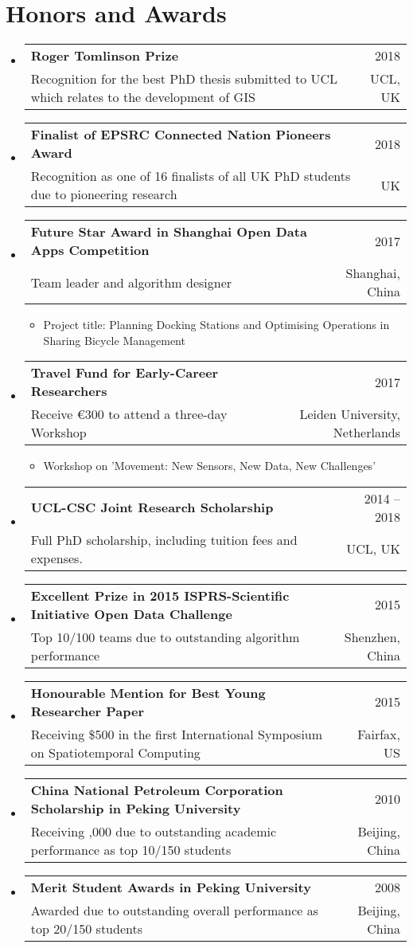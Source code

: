 \documentclass[A4,11pt]{article}
\makeatletter
\newcommand{\CVItem}[1]{
  \item\small{
    {#1 \vspace{-2pt}}
  }
}
\newcommand{\CVSubheading}[4]{
  \vspace{-2pt}\item
    \begin{tabular*}{0.97\textwidth}[t]{l@{\extracolsep{\fill}}r}
      \textbf{#1} & #2 \\
      \small#3 & \small #4 \\
    \end{tabular*}\vspace{-7pt}
}
\newcommand{\CVSubHeadingListStart}{\begin{itemize}[leftmargin=0.5cm, label={}]}
\newcommand{\CVSubHeadingListEnd}{\end{itemize}}
\newcommand{\CVItemListStart}{\begin{itemize}}
\newcommand{\CVItemListEnd}{\end{itemize}\vspace{-5pt}}
\makeatother
\begin{document}
\section{Honors and Awards}
  \CVSubHeadingListStart
    \CVSubheading
      {Roger Tomlinson Prize}{2018}
      {Recognition for the best PhD thesis submitted to UCL which relates to the development of GIS}{UCL, UK}
    \CVSubheading
      {Finalist of EPSRC Connected Nation Pioneers Award}{2018}
      {Recognition as one of 16 finalists of all UK PhD students due to pioneering research}{UK}
    \CVSubheading
      {Future Star Award in Shanghai Open Data Apps Competition}{2017}
      {Team leader and algorithm designer}{Shanghai, China}
      \CVItemListStart
        \CVItem{Project title: Planning Docking Stations and Optimising Operations in Sharing Bicycle Management}
      \CVItemListEnd
    \CVSubheading
      {Travel Fund for Early-Career Researchers}{2017}
      {Receive €300 to attend a three-day Workshop}{Leiden University, Netherlands}
      \CVItemListStart
        \CVItem{Workshop on 'Movement: New Sensors, New Data, New Challenges'}
      \CVItemListEnd
    \CVSubheading
      {UCL-CSC Joint Research Scholarship}{2014 -- 2018}
      {Full PhD scholarship, including tuition fees and expenses.}{UCL, UK}
    \CVSubheading
      {Excellent Prize in 2015 ISPRS-Scientific Initiative Open Data Challenge}{2015}
      {Top 10/100 teams due to outstanding algorithm performance}{Shenzhen, China}
    \CVSubheading
      {Honourable Mention for Best Young Researcher Paper}{2015}
      {Receiving \$500 in the first International Symposium on Spatiotemporal Computing}{Fairfax, US}
    \CVSubheading
      {China National Petroleum Corporation Scholarship in Peking University}{2010}
      {Receiving \textyen5,000 due to outstanding academic performance as top 10/150 students}{Beijing, China}
    \CVSubheading
      {Merit Student Awards in Peking University}{2008}
      {Awarded due to outstanding overall performance as top 20/150 students}{Beijing, China}
      
  \CVSubHeadingListEnd

\begin{comment}
Section is here as it applied to my application for positions in academia. 
Remember to tailor the resume for to the position.
\end{comment}
\end{document}
